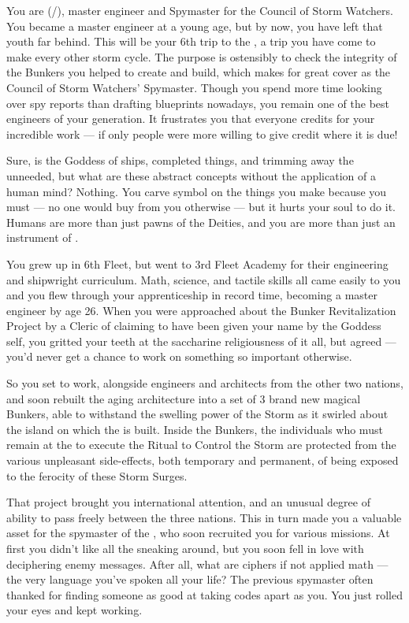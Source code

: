 \documentclass[char]{GL2020}
\begin{document}
\name{\cBunker{}}

You are \cBunker{\full} (\cBunker{\they}/\cBunker{\them}), master engineer and Spymaster for the \pShip{} Council of Storm Watchers. You became a master engineer at a young age, but by now, you have left that youth far behind. This will be your 6th trip to the \pSchool{}, a trip you have come to make every other storm cycle. The purpose is ostensibly to check the integrity of the Bunkers you helped to create and build, which makes for great cover as the Council of Storm Watchers’ Spymaster. Though you spend more time looking over spy reports than drafting blueprints nowadays, you remain one of the best engineers of your generation. It frustrates you that everyone credits \cEbb{} for your incredible work — if only people were more willing to give credit where it is due!

Sure, \cEbb{} is the Goddess of ships, completed things, and trimming away the unneeded, but what are these abstract concepts without the application of a human mind? Nothing. You carve \cEbb{\their} symbol on the things you make because you must — no one would buy from you otherwise — but it hurts your soul to do it. Humans are more than just pawns of the Deities, and you are more than just an instrument of \cEbb{\them}.

You grew up in 6th Fleet, but went to 3rd Fleet Academy for their engineering and shipwright curriculum. Math, science, and tactile skills all came easily to you and you flew through your apprenticeship in record time, becoming a master engineer by age 26. When you were approached about the Bunker Revitalization Project by a Cleric of \cEbb{} claiming to have been given your name by the Goddess \cEbb{\them}self, you gritted your teeth at the saccharine religiousness of it all, but agreed — you'd never get a chance to work on something so important otherwise. 

So you set to work, alongside engineers and architects from the other two nations, and soon rebuilt the aging architecture into a set of 3 brand new magical Bunkers, able to withstand the swelling power of the Storm as it swirled about the island on which the \pSchool{} is built. Inside the Bunkers, the individuals who must remain at the \pSc{} to execute the Ritual to Control the Storm are protected from the various unpleasant side-effects, both temporary and permanent, of being exposed to the ferocity of these Storm Surges.

That project brought you international attention, and an unusual degree of ability to pass freely between the three nations. This in turn made you a valuable asset for the spymaster of the \pShip{}, who soon recruited you for various missions. At first you didn't like all the sneaking around, but you soon fell in love with deciphering enemy messages. After all, what are ciphers if not applied math — the very language you've spoken all your life? The previous spymaster often thanked \cEbb{} for finding someone as good at taking codes apart as you. You just rolled your eyes and kept working.
\end{document}
